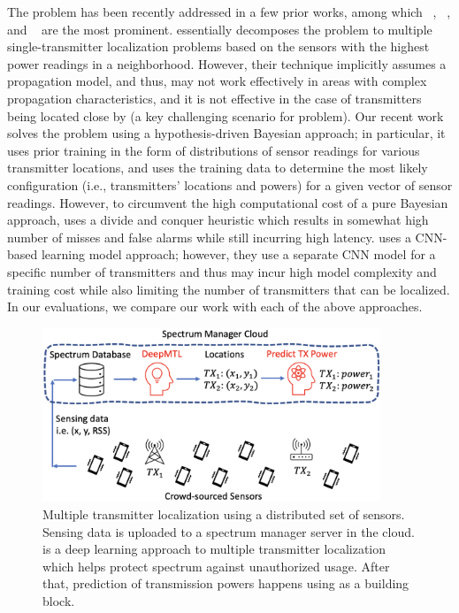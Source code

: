 The \mtl problem has been recently addressed in a few prior works, among which \splot~\cite{mobicom17-splot}, \map~\cite{ipsn20-mtl}, and 
\deeptx~\cite{icccn20-deeptxfinder} are the most 
prominent. \splot essentially decomposes the \mtl
problem to multiple single-transmitter localization problems based on
the sensors with the highest power readings in a
neighborhood. However, their technique implicitly assumes a propagation model, and
thus, may not work effectively in areas with complex propagation
characteristics, and it is not effective in the case of transmitters
being located close by (a key challenging scenario for \mtl problem).
Our recent work \map solves the \mtl problem using a 
hypothesis-driven Bayesian approach; in particular, it uses prior training in the form of distributions
of sensor readings for various transmitter locations, and uses the training data to determine
the most likely configuration (i.e., transmitters' locations and powers) for a 
given vector of sensor readings. 
However, to circumvent the high computational cost of a pure Bayesian approach,
\map uses a divide and conquer heuristic which results in somewhat 
high number of misses and false alarms while still incurring high
latency. 
\deeptx uses a CNN-based learning model approach; 
however, they use a separate CNN model for a specific number of transmitters
and thus may incur high model complexity and training cost while also limiting the number 
of transmitters that can be localized.
In our evaluations, we compare our work with each of the above approaches.

\begin{figure}[t]
\centering
\includegraphics[width=0.9\textwidth]{chapters/wowmom-pmc/figures/architecture.png}
\caption{Multiple transmitter localization using a distributed set of sensors. Sensing data is uploaded to a spectrum manager server in the cloud. \our is a deep learning approach to multiple transmitter localization which helps protect 
spectrum against unauthorized usage. After that, prediction of transmission powers happens using \our as a building block.}
\label{fig:illustration}
\end{figure}

